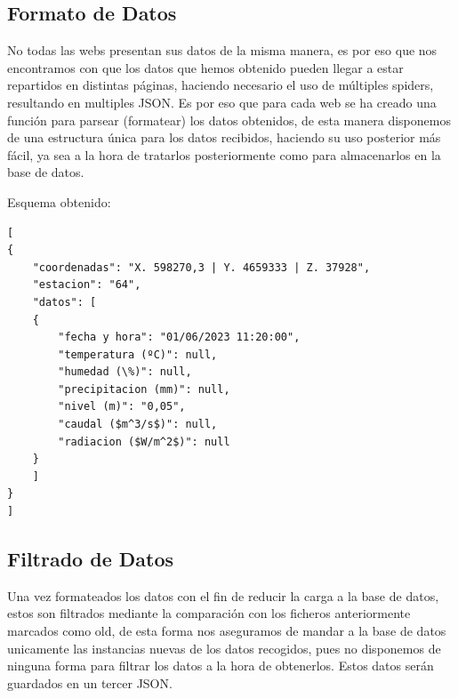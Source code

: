 \subsection{Formato de Datos}
No todas las webs presentan sus datos de la misma manera, es por eso que nos encontramos con que los datos que hemos obtenido pueden llegar a estar repartidos en distintas páginas, haciendo necesario el uso de múltiples spiders, resultando en multiples JSON.\newline
Es por eso que para cada web se ha creado una función para parsear (formatear) los datos obtenidos, de esta manera disponemos de una estructura única para los datos recibidos, haciendo su uso posterior más fácil, ya sea a la hora de tratarlos posteriormente como para almacenarlos en la base de datos.

Esquema obtenido:
\newline
\newline
\newline
\begin{verbatim}
[
{
	"coordenadas": "X. 598270,3 | Y. 4659333 | Z. 37928",
	"estacion": "64",
	"datos": [
	{
		"fecha y hora": "01/06/2023 11:20:00",
		"temperatura (ºC)": null,
		"humedad (\%)": null,
		"precipitacion (mm)": null,
		"nivel (m)": "0,05",
		"caudal ($m^3/s$)": null,
		"radiacion ($W/m^2$)": null
	}
	]
}
]
\end{verbatim}

\subsection{Filtrado de Datos}
Una vez formateados los datos con el fin de reducir la carga a la base de datos, estos son filtrados mediante la comparación con los ficheros anteriormente marcados como old, de esta forma nos aseguramos de mandar a la base de datos unicamente las instancias nuevas de los datos recogidos, pues no disponemos de ninguna forma para filtrar los datos a la hora de obtenerlos. Estos datos serán guardados en un tercer JSON.

